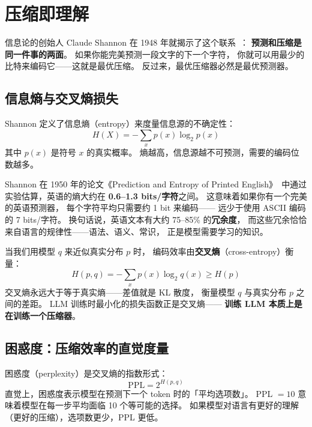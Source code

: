 \section{压缩即理解}

信息论的创始人 Claude Shannon 在 1948 年就揭示了这个联系~\cite{shannon1948}：
\textbf{预测和压缩是同一件事的两面}。
如果你能完美预测一段文字的下一个字符，
你就可以用最少的比特来编码它——这就是最优压缩。
反过来，最优压缩器必然是最优预测器。

\subsection{信息熵与交叉熵损失}

Shannon 定义了信息熵（entropy）来度量信息源的不确定性：
\begin{equation}
  H(X) = -\sum_{x} p(x) \log_2 p(x)
\end{equation}
其中 $p(x)$ 是符号 $x$ 的真实概率。
熵越高，信息源越不可预测，需要的编码位数越多。

Shannon 在 1950 年的论文《Prediction and Entropy of Printed English》~\cite{shannon1950}中通过实验估算，英语的熵大约在 \textbf{0.6--1.3 bits/字符}之间。
这意味着如果你有一个完美的英语预测器，
每个字符平均只需要约 1 bit 来编码——
远少于使用 ASCII 编码的 7 bits/字符。
换句话说，英语文本有大约 75--85\% 的\textbf{冗余度}，
而这些冗余恰恰来自语言的规律性——语法、语义、常识，
正是模型需要学习的知识。

当我们用模型 $q$ 来近似真实分布 $p$ 时，
编码效率由\textbf{交叉熵}（cross-entropy）衡量：
\begin{equation}
  H(p, q) = -\sum_{x} p(x) \log_2 q(x) \geq H(p)
\end{equation}
交叉熵永远大于等于真实熵——差值就是 KL 散度，
衡量模型 $q$ 与真实分布 $p$ 之间的差距。
LLM 训练时最小化的损失函数正是交叉熵——
\textbf{训练 LLM 本质上是在训练一个压缩器}。

\subsection{困惑度：压缩效率的直觉度量}

困惑度（perplexity）是交叉熵的指数形式：
\begin{equation}
  \mathrm{PPL} = 2^{H(p, q)}
\end{equation}
直觉上，困惑度表示模型在预测下一个 token 时的「平均选项数」。
PPL $= 10$ 意味着模型在每一步平均面临 10 个等可能的选择。
如果模型对语言有更好的理解（更好的压缩），选项数更少，PPL 更低。

